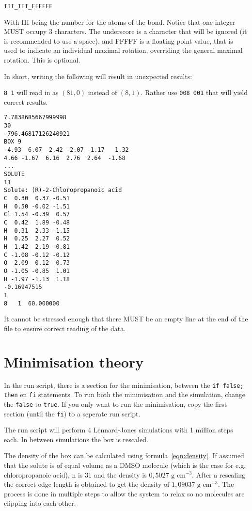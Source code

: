\verb|III_III_FFFFFF|

With III being the number for the atoms of the bond. Notice that one integer 
MUST occupy 3 characters. The underscore is a character that will be ignored 
(it is recommended to use a space), 
and FFFFF is a floating point value, that is used to indicate an individual 
maximal rotation, overriding the general maximal rotation. This is optional.

In short, writing the following will result in unexpected results:

\verb|8 1| will read in as $(81, 0)$ instead of $(8, 1)$. Rather use 
\verb|008 001| that will yield correct results.

\begin{lstlisting}[caption=Example of a correct box-file]
7.7838685667999998     
30
-796.46817126240921     
BOX 9
-4.93  6.07  2.42 -2.07 -1.17   1.32     
4.66 -1.67  6.16  2.76  2.64  -1.68     
...     
SOLUTE
11
Solute: (R)-2-Chloropropanoic acid
C  0.30  0.37 -0.51
H  0.50 -0.02 -1.51
Cl 1.54 -0.39  0.57
C  0.42  1.89 -0.48
H -0.31  2.33 -1.15
H  0.25  2.27  0.52
H  1.42  2.19 -0.81
C -1.08 -0.12 -0.12
O -2.09  0.12 -0.73
O -1.05 -0.85  1.01
H -1.97 -1.13  1.18
-0.16947515     
1
8   1  60.000000

\end{lstlisting}

It cannot be stressed enough that there MUST be an empty line at the end of the 
file to ensure correct reading of the data.

\section{Minimisation theory}
In the run script, there is a section for the minimisation, between the 
\verb|if false; then| en \verb|fi| statements. To run both the minimisation and 
the simulation, change the \verb|false| to \verb|true|. If you only want to run 
the minimisation, copy the first section (until the \verb|fi|) to a seperate 
run script.

The run script will perform 4 Lennard-Jones simulations with 1 million steps 
each. In between simulations the box is rescaled.

The density of the box can be calculated using formula~\ref{eqn:density}. If 
assumed that the solute is of equal volume as a DMSO molecule (which is the 
case for e.g. chloropropanoic acid), n is 31 and the density is $0,5027 
\textrm{ g cm}^{-3}$. After a rescaling the correct edge length is obtained to 
get the density of $1,09037 \textrm{ g cm}^{-3}$.\cite{Radhamma2008}
The process is done in multiple steps to allow the system to relax so no 
molecules are clipping into each other.

